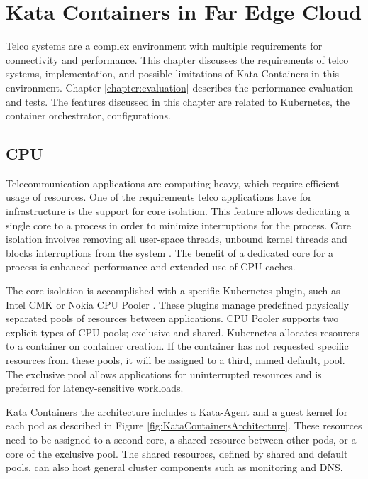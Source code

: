 \chapter{Kata Containers in Far Edge Cloud}
\label{chapter:implementation}

Telco systems are a complex environment with multiple requirements for connectivity and performance. This chapter discusses the requirements of telco systems, implementation, and possible limitations of Kata Containers in this environment. Chapter \ref{chapter:evaluation} describes the performance evaluation and tests. The features discussed in this chapter are related to Kubernetes, the container orchestrator, configurations.

\section{CPU}

Telecommunication applications are computing heavy, which require efficient usage of resources. One of the requirements telco applications have for infrastructure is the support for core isolation. This feature allows dedicating a single core to a process in order to minimize interruptions for the process. Core isolation involves removing all user-space threads, unbound kernel threads and blocks interruptions from the system \cite{CPUisolation}. The benefit of a dedicated core for a process is enhanced performance and extended use of CPU caches.

The core isolation is accomplished with a specific Kubernetes plugin, such as Intel CMK \cite{IntelCMK} or Nokia CPU Pooler \cite{NokiaCPUPooler}. These plugins manage predefined physically separated pools of resources between applications. CPU Pooler supports two explicit types of CPU pools; exclusive and shared. Kubernetes allocates resources to a container on container creation. If the container has not requested specific resources from these pools, it will be assigned to a third, named default, pool. The exclusive pool allows applications for uninterrupted resources and is preferred for latency-sensitive workloads.

Kata Containers the architecture includes a Kata-Agent and a guest kernel for each pod as described in Figure \ref{fig:KataContainersArchitecture}. These resources need to be assigned to a second core, a shared resource between other pods, or a core of the exclusive pool. The shared resources, defined by shared and default pools, can also host general cluster components such as monitoring and DNS.

